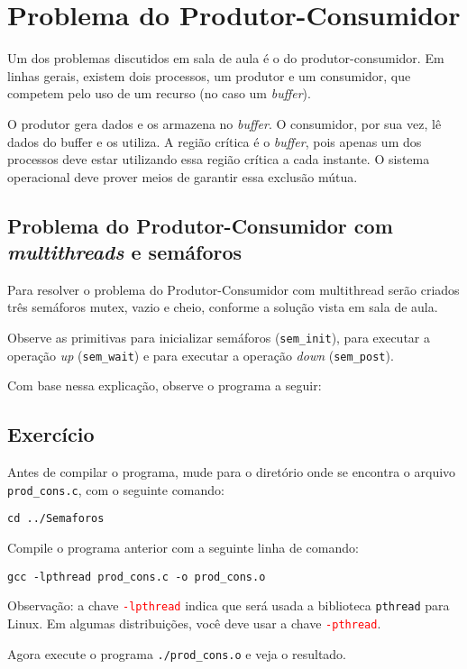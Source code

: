 \chapter{Problema do Produtor-Consumidor}
Um dos problemas discutidos em sala de aula é o do produtor-consumidor. Em linhas gerais, existem dois processos, um produtor e um consumidor, que competem pelo uso de um recurso (no caso um \textit{buffer}).

O produtor gera dados e os armazena no \textit{buffer}. O consumidor, por sua vez, lê dados do buffer e os utiliza. A região crítica é o \textit{buffer}, pois apenas um dos processos deve estar utilizando essa região crítica a cada instante. O sistema operacional deve prover meios de garantir essa exclusão mútua.


\section{Problema do Produtor-Consumidor com \textit{multithreads} e semáforos}
Para resolver o problema do Produtor-Consumidor com multithread serão criados três semáforos mutex, vazio e cheio, conforme a solução vista em sala de aula.

Observe as primitivas para inicializar semáforos (\texttt{sem\_init}), para executar a operação \textit{up} (\texttt{sem\_wait}) e para executar a operação \textit{down} (\texttt{sem\_post}).

Com base nessa explicação, observe o programa a seguir: 


\section{Exercício}
Antes de compilar o programa, mude para o diretório onde se encontra o arquivo \texttt{prod\_cons.c}, com o seguinte comando:

\begin{lstlisting}[style=MyBashStyle]
cd ../Semaforos
\end{lstlisting}

Compile o programa anterior com a seguinte linha de comando:

\begin{lstlisting}[style=MyBashStyle]
gcc -lpthread prod_cons.c -o prod_cons.o
\end{lstlisting}

\textcolor{orange}{\faWarning} Observação: a chave \textcolor{red}{\texttt{-lpthread}} indica que será usada a biblioteca \texttt{pthread} para Linux. Em algumas distribuições, você deve usar a chave \textcolor{red}{\texttt{-pthread}}.

Agora execute o programa \texttt{./prod\_cons.o} e veja o resultado.